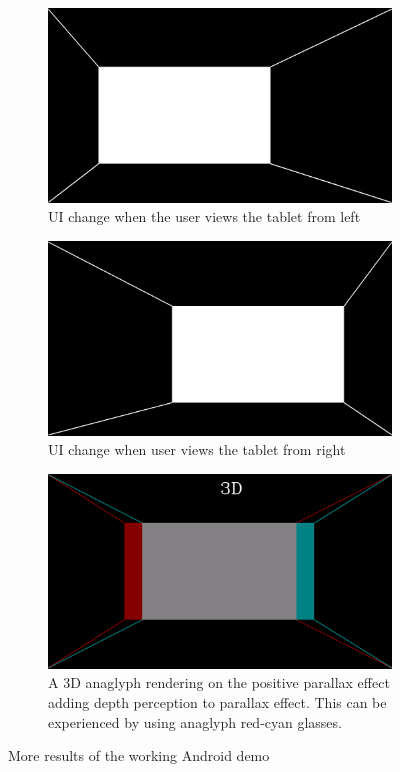 \documentclass[12pt,twocolumn,letterpaper]{article}
\begin{document}
\begin{figure}[!htbp]
\begin{subfigure}{0.5\textwidth}
\includegraphics[scale=0.09]{images/3dperspective_user_left}
\caption{UI change when the user views the tablet from left}
\end{subfigure}
\begin{subfigure}{0.5\textwidth}
\includegraphics[scale=0.09]{images/3dperspective_user_right}
\caption{UI change when user views the tablet from right}
\end{subfigure}
\begin{subfigure}{0.5\textwidth}
\includegraphics[scale=0.09]{images/anaglyph}
\caption{A 3D anaglyph rendering on the positive parallax effect adding depth perception to parallax effect. This can be experienced by using anaglyph red-cyan glasses.}
\end{subfigure}
\caption{More results of the working Android demo}
\label{fig:androiddemo2}
\end{figure}
\end{document}
